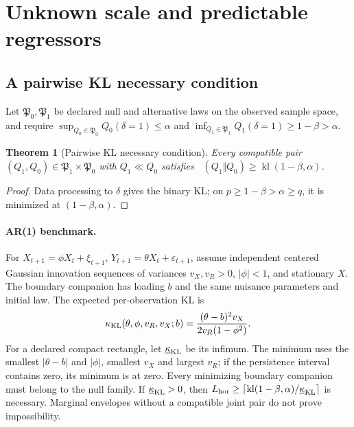 \documentclass[11pt]{article}
\numberwithin{equation}{section}
\theoremstyle{plain}
\newtheorem{theorem}{Theorem}[section]
\theoremstyle{definition}
\theoremstyle{remark}
\DeclareMathOperator{\KL}{D_{\mathrm{KL}}}
\begin{document}
\section{Unknown scale and predictable regressors}\label{composite-uncertainty-and-unknown-scale}

\subsection{A pairwise KL necessary condition}\label{composite-pairwise-kl-condition}
Let $\mathfrak P_0,\mathfrak P_1$ be declared null and alternative laws on the observed sample space, and require $\sup_{Q_0\in\mathfrak P_0}Q_0(\delta=1)\le\alpha$ and $\inf_{Q_1\in\mathfrak P_1}Q_1(\delta=1)\ge1-\beta>\alpha$.
\begin{theorem}[Pairwise KL necessary condition]\label{thm:composite-kl-obstruction}
Every compatible pair $(Q_1,Q_0)\in\mathfrak P_1\times\mathfrak P_0$ with $Q_1\ll Q_0$ satisfies $\KL(Q_1\Vert Q_0)\ge\operatorname{kl}(1-\beta,\alpha)$.
\end{theorem}
\begin{proof} Data processing to $\delta$ gives the binary KL; on $p\ge1-\beta>\alpha\ge q$, it is minimized at $(1-\beta,\alpha)$.\end{proof}

\paragraph{AR(1) benchmark.}\label{g2-stationary-information-rate}
For $X_{t+1}=\phi X_t+\xi_{t+1}$, $Y_{t+1}=\theta X_t+\varepsilon_{t+1}$, assume independent centered Gaussian innovation sequences of variances $v_X,v_R>0$, $|\phi|<1$, and stationary $X$. The boundary companion has loading $b$ and the same nuisance parameters and initial law. The expected per-observation KL is
\[
\kappa_{\rm KL}(\theta,\phi,v_R,v_X;b)=\frac{(\theta-b)^2v_X}{2v_R(1-\phi^2)}.
\]
For a declared compact rectangle, let $\underline\kappa_{\rm KL}$ be its infimum. The minimum uses the smallest $|\theta-b|$ and $|\phi|$, smallest $v_X$ and largest $v_R$; if the persistence interval contains zero, its minimum is at zero. Every minimizing boundary companion must belong to the null family. If $\underline\kappa_{\rm KL}>0$, then $L_{\rm hor}\ge\lceil\operatorname{kl}(1-\beta,\alpha)/\underline\kappa_{\rm KL}\rceil$ is necessary. Marginal envelopes without a compatible joint pair do not prove impossibility.
\end{document}
